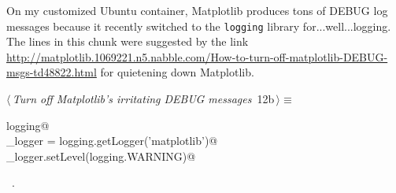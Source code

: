 \documentclass[11.5pt]{report}
\begin{document}
\begin{flushleft}
\begin{minipage}{\linewidth}
\begin{list}{}{\setlength{\itemsep}{-\parsep}\setlength{\itemindent}{-\leftmargin}}
\item{}
\end{list}
\end{minipage}\vspace{4ex}
\end{flushleft}
\newchunk On my customized Ubuntu container, Matplotlib produces tons of DEBUG log messages because  
it recently switched to the \verb|logging| library for...well...logging. 
The lines in this chunk were suggested by the link \url{http://matplotlib.1069221.n5.nabble.com/How-to-turn-off-matplotlib-DEBUG-msgs-td48822.html} 
for quietening down Matplotlib.  


\begin{flushleft} \small
\begin{minipage}{\linewidth}\label{scrap2}\raggedright\small
{} $\langle\,${\itshape Turn off Matplotlib's irritating DEBUG messages}\nobreak\ {\footnotesize {12b}}$\,\rangle\equiv$
\vspace{-1ex}
\begin{list}{}{} \item
\mbox{}\verb@import logging@\\
\mbox{}\verb@mpl_logger = logging.getLogger('matplotlib')@\\
\mbox{}\verb@mpl_logger.setLevel(logging.WARNING)@\\
\mbox{}\verb@@{\NWsep}
\end{list}
\vspace{-1.5ex}
\footnotesize
\begin{list}{}{\setlength{\itemsep}{-\parsep}\setlength{\itemindent}{-\leftmargin}}
\item \NWtxtMacroRefIn\ .

\item{}
\end{list}
\end{minipage}\vspace{4ex}
\end{flushleft}
\end{document}
